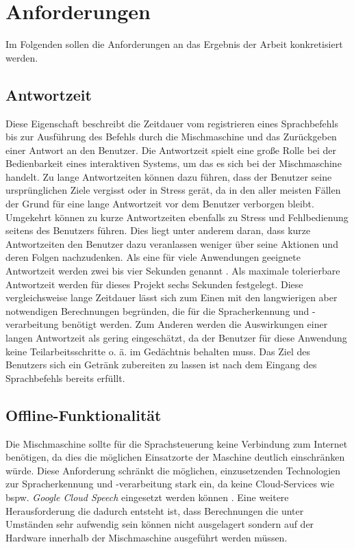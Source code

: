 \chapter{Anforderungen} \label{chap:Anforderungen}
Im Folgenden sollen die Anforderungen an das Ergebnis der Arbeit konkretisiert werden.
\section{Antwortzeit}
Diese Eigenschaft beschreibt die Zeitdauer vom registrieren eines Sprachbefehls bis zur Ausführung des Befehls durch die Mischmaschine und das Zurückgeben einer Antwort an den Benutzer. Die Antwortzeit spielt eine große Rolle bei der Bedienbarkeit eines interaktiven Systems, um das es sich bei der Mischmaschine handelt. Zu lange Antwortzeiten können dazu führen, dass der Benutzer seine ursprünglichen Ziele vergisst oder in Stress gerät, da in den aller meisten Fällen der Grund für eine lange Antwortzeit vor dem Benutzer verborgen bleibt. Umgekehrt können zu kurze Antwortzeiten ebenfalls zu Stress und Fehlbedienung seitens des Benutzers führen. Dies liegt unter anderem daran, dass kurze Antwortzeiten den Benutzer dazu veranlassen weniger über seine Aktionen und deren Folgen nachzudenken. Als eine für viele Anwendungen geeignete Antwortzeit werden zwei bis vier Sekunden genannt \cite{herczeg_9_2018}. Als maximale tolerierbare Antwortzeit werden für dieses Projekt sechs Sekunden festgelegt. Diese vergleichsweise lange Zeitdauer lässt sich zum Einen mit den langwierigen aber notwendigen Berechnungen begründen, die für die Spracherkennung und -verarbeitung benötigt werden. Zum Anderen werden die Auswirkungen einer langen Antwortzeit als gering eingeschätzt, da der Benutzer für diese Anwendung keine Teilarbeitsschritte o. ä. im Gedächtnis behalten muss. Das Ziel des Benutzers sich ein Getränk zubereiten zu lassen ist nach dem Eingang des Sprachbefehls bereits erfüllt.
\section{Offline-Funktionalität}
Die Mischmaschine sollte für die Sprachsteuerung keine Verbindung zum Internet benötigen, da dies die möglichen Einsatzorte der Maschine deutlich einschränken würde.  Diese Anforderung schränkt die möglichen, einzusetzenden Technologien zur Spracherkennung und -verarbeitung stark ein, da keine Cloud-Services wie bspw. \textit{Google Cloud Speech} eingesetzt werden können \cite{google_cloud_speech}. Eine weitere Herausforderung die dadurch entsteht ist, dass Berechnungen die unter Umständen sehr aufwendig sein können nicht ausgelagert sondern auf der Hardware innerhalb der Mischmaschine ausgeführt werden müssen.
